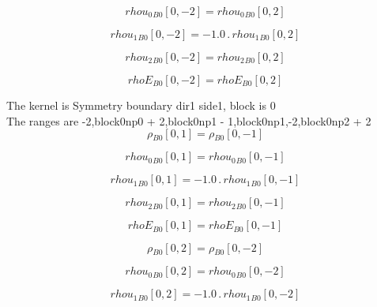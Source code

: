 \documentclass{article}
\begin{document}
\begin{dmath}{rhou_{0}{_{B0}}}[{0,-2}] = {rhou_{0}{_{B0}}}[{0,2}]\end{dmath}

\begin{dmath}{rhou_{1}{_{B0}}}[{0,-2}] = - 1.0 \,.\, {rhou_{1}{_{B0}}}[{0,2}]\end{dmath}

\begin{dmath}{rhou_{2}{_{B0}}}[{0,-2}] = {rhou_{2}{_{B0}}}[{0,2}]\end{dmath}

\begin{dmath}{rhoE{_{B0}}}[{0,-2}] = {rhoE{_{B0}}}[{0,2}]\end{dmath}

\noindent The kernel is Symmetry boundary dir1 side1, block is 0\\\noindent The ranges are -2,block0np0 + 2,block0np1 - 1,block0np1,-2,block0np2 + 2\\\begin{dmath}{\rho{_{B0}}}[{0,1}] = {\rho{_{B0}}}[{0,-1}]\end{dmath}

\begin{dmath}{rhou_{0}{_{B0}}}[{0,1}] = {rhou_{0}{_{B0}}}[{0,-1}]\end{dmath}

\begin{dmath}{rhou_{1}{_{B0}}}[{0,1}] = - 1.0 \,.\, {rhou_{1}{_{B0}}}[{0,-1}]\end{dmath}

\begin{dmath}{rhou_{2}{_{B0}}}[{0,1}] = {rhou_{2}{_{B0}}}[{0,-1}]\end{dmath}

\begin{dmath}{rhoE{_{B0}}}[{0,1}] = {rhoE{_{B0}}}[{0,-1}]\end{dmath}

\begin{dmath}{\rho{_{B0}}}[{0,2}] = {\rho{_{B0}}}[{0,-2}]\end{dmath}

\begin{dmath}{rhou_{0}{_{B0}}}[{0,2}] = {rhou_{0}{_{B0}}}[{0,-2}]\end{dmath}

\begin{dmath}{rhou_{1}{_{B0}}}[{0,2}] = - 1.0 \,.\, {rhou_{1}{_{B0}}}[{0,-2}]\end{dmath}
\end{document}

